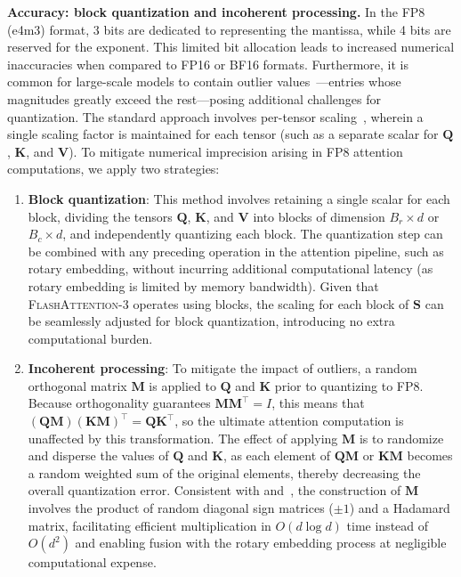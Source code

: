 \begin{algorithm}[H]
\begin{algorithmic}[1]
\textbf{Accuracy: block quantization and incoherent processing.} In the FP8 (e4m3) format, 3 bits are dedicated to representing the mantissa, while 4 bits are reserved for the exponent. This limited bit allocation leads to increased numerical inaccuracies when compared to FP16 or BF16 formats. Furthermore, it is common for large-scale models to contain outlier values~\citep{dettmers2208llm, sun2024massive}—entries whose magnitudes greatly exceed the rest—posing additional challenges for quantization. The standard approach involves per-tensor scaling~\citep{micikevicius2022fp8}, wherein a single scaling factor is maintained for each tensor (such as a separate scalar for $\mathbf{Q}$, $\mathbf{K}$, and $\mathbf{V}$). To mitigate numerical imprecision arising in FP8 attention computations, we apply two strategies:

\begin{enumerate}

\item \textbf{Block quantization}: This method involves retaining a single scalar for each block, dividing the tensors $\mathbf{Q}$, $\mathbf{K}$, and $\mathbf{V}$ into blocks of dimension $B_r \times d$ or $B_c \times d$, and independently quantizing each block. The quantization step can be combined with any preceding operation in the attention pipeline, such as rotary embedding, without incurring additional computational latency (as rotary embedding is limited by memory bandwidth). Given that \textsc{FlashAttention-3} operates using blocks, the scaling for each block of $\mathbf{S}$ can be seamlessly adjusted for block quantization, introducing no extra computational burden.
\item \textbf{Incoherent processing}: To mitigate the impact of outliers, a random orthogonal matrix $\mathbf{M}$ is applied to $\mathbf{Q}$ and $\mathbf{K}$ prior to quantizing to FP8. Because orthogonality guarantees $\mathbf{M} \mathbf{M}^\top = I$, this means that $(\mathbf{Q}\mathbf{M})(\mathbf{K}\mathbf{M})^\top = \mathbf{Q}\mathbf{K}^\top$, so the ultimate attention computation is unaffected by this transformation. The effect of applying $\mathbf{M}$ is to randomize and disperse the values of $\mathbf{Q}$ and $\mathbf{K}$, as each element of $\mathbf{Q}\mathbf{M}$ or $\mathbf{K}\mathbf{M}$ becomes a random weighted sum of the original elements, thereby decreasing the overall quantization error. Consistent with \citet{chee2024quip} and~\citet{tseng2024quip}, the construction of $\mathbf{M}$ involves the product of random diagonal sign matrices ($\pm 1$) and a Hadamard matrix, facilitating efficient multiplication in $O(d \log d)$ time instead of $O(d^2)$ and enabling fusion with the rotary embedding process at negligible computational expense.
\end{enumerate}


\end{algorithmic}
\end{algorithm}
